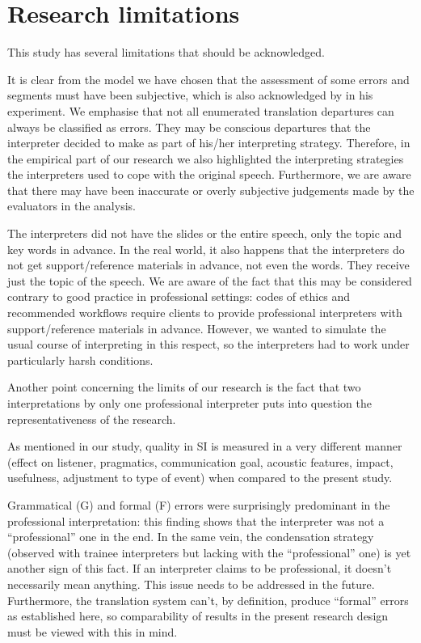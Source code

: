 \documentclass[output=paper]{langscibook}
\begin{document}
\section{Research limitations}\label{sec:kloudova:6}

This study has several limitations that should be acknowledged.

It is clear from the model we have chosen that the assessment of some errors and segments must have been subjective, which is also acknowledged by \citet{Barik1971} in his experiment. We emphasise that not all enumerated translation departures can always be classified as errors. They may be conscious departures that the interpreter decided to make as part of his/her interpreting strategy. Therefore, in the empirical part of our research we also highlighted the interpreting strategies the interpreters used to cope with the original speech. Furthermore, we are aware that there may have been inaccurate or overly subjective judgements made by the evaluators in the analysis.

The interpreters did not have the slides or the entire speech, only the topic and key words in advance. In the real world, it also happens that the interpreters do not get support/reference materials in advance, not even the words. They receive just the topic of the speech. We are aware of the fact that this may be considered contrary to good practice in professional settings: codes of ethics and recommended workflows require clients to provide professional interpreters with support/reference materials in advance. However, we wanted to simulate the usual course of interpreting in this respect, so the interpreters had to work under particularly harsh conditions.

Another point concerning the limits of our research is the fact that two interpretations by only one professional interpreter puts into question the representativeness of the research.

As mentioned in our study, quality in SI is measured in a very different manner (effect on listener, pragmatics, communication goal, acoustic features, impact, usefulness, adjustment to type of event) when compared to the present study.

Grammatical (G) and formal (F) errors were surprisingly predominant in the professional interpretation: this finding shows that the interpreter was not a “professional” one in the end. In the same vein, the condensation strategy (observed with trainee interpreters but lacking with the “professional” one) is yet another sign of this fact. If an interpreter claims to be professional, it doesn’t necessarily mean anything. This issue needs to be addressed in the future. Furthermore, the translation system can’t, by definition, produce “formal” errors as established here, so comparability of results in the present research design must be viewed with this in mind.
\end{document}
